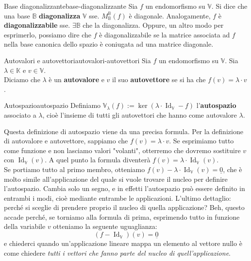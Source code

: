 \documentclass[12pt]{report}
\newcommand{\K}{\mathbb{K}}
\newcommand{\V}{\mathbb{V}}
\newcommand{\associatedmatrix}[2]{M^{\mathbb{#1}}_{\mathbb{#2}}}
\newcommand{\nullvector}{\underline{0}}
\begin{document}
	\begin{definizione}{Base diagonalizzante}{base-diagonalizzante}
		Sia $f$ un endomorfismo su $\V$. Si dice che una base $\mathbb{B}$ \textbf{diagonalizza} $\V$ sse. $\associatedmatrix{B}{B}(f)$ è diagonale.
		Analogamente, $f$ è \textbf{diagonalizzabile} sse. $\exists \mathbb{B}$ che la diagonalizza.
		Oppure, un altro modo per esprimerlo, possiamo dire che $f$ è diagonalizzabile se la matrice associata ad $f$ nella base canonica dello spazio è coniugata ad una matrice diagonale.
	\end{definizione}
	
	\begin{definizione}{Autovalori e autovettori}{autovalori-autovettori}
		Sia $f$ un endomorfismo su $\V$. Sia $\lambda \in \K$ e $v \in \V$.\\
		Diciamo che $\lambda$ è un \textbf{autovalore} e $v$ il suo \textbf{autovettore} se si ha che $f(v) = \lambda \cdot v$.
	\end{definizione}
	
	\begin{definizione}{Autospazio}{autospazio}
		Definiamo $\V_\lambda(f) := \ker(\lambda \cdot \operatorname{Id}_\V - f)$ l'\textbf{autospazio} associato a $\lambda$, cioè l'insieme di tutti gli autovettori che hanno come autovalore $\lambda$.
	\end{definizione}
	Questa definizione di autospazio viene da una precisa formula.
	Per la definizione di autovalore e autovettore, sappiamo che $f(v) = \lambda \cdot v$. Se esprimiamo tutto come funzione e non lasciamo valori "volanti", otterremo che dovremo sostituire $v$ con $\operatorname{Id}_\V(v)$. A quel punto la formula diventerà $f(v) = \lambda \cdot \operatorname{Id}_\V(v)$.\\
	Se portiamo tutto al primo membro, otteniamo $f(v) - \lambda \cdot \operatorname{Id}_\V(v) = \nullvector$, che è molto simile all'applicazione del quale si vuole trovare il nucleo per definire l'autospazio. Cambia solo un segno, e in effetti l'autospazio può essere definito in entrambi i modi, cioè mediante entrambe le applicazioni.
	L'ultimo dettaglio: perché si sceglie di prendere proprio il nucleo di quella applicazione? Beh, questo accade perché, se torniamo alla formula di prima, esprimendo tutto in funzione della variabile $v$ otteniamo la seguente uguaglianza:
	\[
		(f - \operatorname{Id}_\V)(v) = \nullvector
	\]
	e chiederci quando un'applicazione lineare mappa un elemento al vettore nullo è come chiedere \textit{tutti i vettori che fanno parte del nucleo di quell'applicazione}.
	
\end{document}
